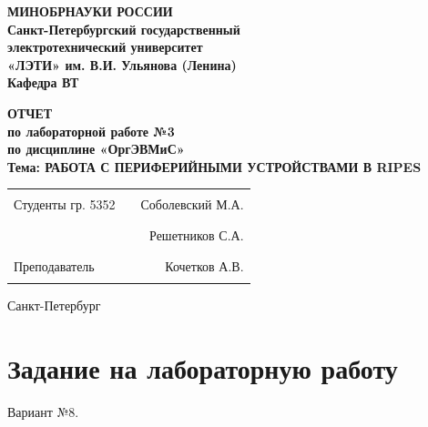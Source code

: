 \documentclass[12pt]{extarticle}
\begin{document}
\begin{center}
  \textbf{МИНОБРНАУКИ РОССИИ} \\
  \textbf{Санкт-Петербургский государственный} \\
  \textbf{электротехнический университет} \\
  \textbf{«ЛЭТИ» им. В.И. Ульянова (Ленина)} \\
  \textbf{Кафедра ВТ} \\
\end{center}

\vspace{0.25\textheight}

\begin{center}
\textbf{ОТЧЕТ} \\
\textbf{по лабораторной работе №3} \\
\textbf{по дисциплине «ОргЭВМиС»} \\
\textbf{Тема: РАБОТА С ПЕРИФЕРИЙНЫМИ УСТРОЙСТВАМИ В RIPES} \\
\end{center}

\vspace*{\fill}

\begin{center}
\begin{tabularx}{\textwidth}{ l X r }
 Студенты гр. 5352 & \rule{8cm}{0.2mm} & Соболевский М.А. \\
 & \rule{8cm}{0.2mm} & Решетников С.А. \\
 Преподаватель & \rule{8cm}{0.2mm} & Кочетков А.В. \\
\end{tabularx}
\end{center}

\vspace{3em}

\begin{center}
Санкт-Петербург\\
\the\year
\end{center}

\thispagestyle{empty}

\pagebreak

\section{Задание на лабораторную работу}

Вариант №8.
\end{document}
